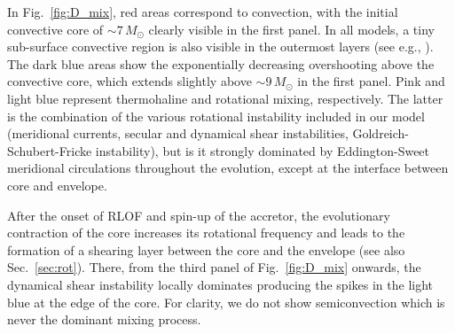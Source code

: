 \documentclass[twocolumn,twocolappendix,trackchanges]{aastex63}
\DeclareRobustCommand{\Figref}[1]{Fig.~\ref{#1}}
\DeclareRobustCommand{\Secref}[1]{Sec.~\ref{#1}}
\begin{document}
In \Figref{fig:D_mix}, red areas correspond to convection, with the
initial convective core of
$\sim$$7\,M_\odot$ clearly visible in the first panel. In all models, a tiny sub-surface convective region is also visible in the outermost layers (see e.g., \citealt{cantiello:21}).  The dark blue areas show the exponentially decreasing overshooting above the convective core, which extends slightly above
$\sim$$9\,M_\odot$ in the first panel. Pink and light blue represent
thermohaline and rotational mixing, respectively. The latter is the
combination of the various rotational instability included in our
model (meridional currents, secular and dynamical shear instabilities,
Goldreich-Schubert-Fricke instability), but is it strongly dominated
by Eddington-Sweet meridional circulations throughout the evolution,
except at the interface between core and envelope.




After the onset of
RLOF and spin-up of the accretor, the evolutionary contraction of the core increases its
rotational frequency and leads to the formation of a shearing layer
between the core and the envelope (see also \Secref{sec:rot}). There, from the third panel of
\Figref{fig:D_mix} onwards, the dynamical shear instability locally
dominates producing the spikes in the light blue at the edge of the core.
For clarity, we do not show semiconvection
which is never the dominant mixing process.

\end{document}
